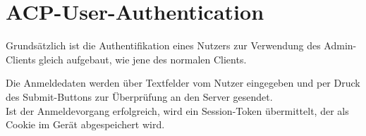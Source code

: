 \section{ACP-User-Authentication}

Grundsätzlich ist die Authentifikation eines Nutzers zur Verwendung des Admin-Clients
gleich aufgebaut, wie jene des normalen Clients.

Die Anmeldedaten werden über Textfelder vom Nutzer eingegeben und per Druck des Submit-Buttons
zur Überprüfung an den Server gesendet.\\
Ist der Anmeldevorgang erfolgreich, wird ein Session-Token übermittelt, der als Cookie
im Gerät abgespeichert wird.